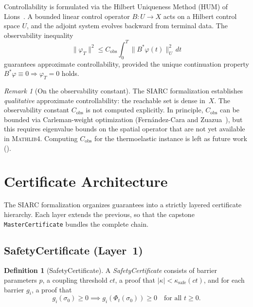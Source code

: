 \documentclass[11pt,a4paper]{article}
\theoremstyle{plain}
\theoremstyle{definition}
\newtheorem{definition}[theorem]{Definition}
\theoremstyle{remark}
\newtheorem{remark}[theorem]{Remark}
\newcommand{\norm}[1]{\lVert #1 \rVert}
\newcommand{\abs}[1]{\lvert #1 \rvert}
\newcommand{\kk}{\kappa}
\newcommand{\Mathlib}{\textsc{Mathlib4}}
\newcommand{\leaninline}[1]{\texttt{#1}}
\begin{document}
Controllability is formulated via the Hilbert Uniqueness Method (HUM) of
Lions~\cite{Lions1988}.  A bounded linear control operator
$B : U \to X$ acts on a Hilbert control space $U$, and the adjoint
system evolves backward from terminal data.  The observability inequality
\begin{equation}\label{eq:obs-ineq}
  \norm{\varphi_T}^2 \le C_{\mathrm{obs}} \int_0^T \norm{B^* \varphi(t)}_U^2 \, dt
\end{equation}
guarantees approximate controllability, provided the unique continuation
property $B^* \varphi \equiv 0 \Rightarrow \varphi_T = 0$ holds.

\begin{remark}[On the observability constant]\label{rem:cobs}
The SIARC formalization establishes \emph{qualitative} approximate
controllability: the reachable set is dense in~$X$.  The observability
constant $C_{\mathrm{obs}}$ is not computed explicitly.  In principle,
$C_{\mathrm{obs}}$ can be bounded via Carleman-weight optimization
(Fern\'{a}ndez-Cara and Zuazua~\cite{FernandezCara2000}), but this
requires eigenvalue bounds on the spatial operator that are not yet
available in \Mathlib{}.  Computing $C_{\mathrm{obs}}$ for the
thermoelastic instance is left as future work ().
\end{remark}


\section{Certificate Architecture}\label{sec:cert}

The SIARC formalization organizes guarantees into a strictly layered
certificate hierarchy.  Each layer extends the previous, so that the
capstone \leaninline{MasterCertificate} bundles the complete chain.

\subsection{SafetyCertificate (Layer~1)}

\begin{definition}[SafetyCertificate]\label{def:safety-cert}
A \emph{SafetyCertificate} consists of barrier parameters $p$, a
coupling threshold $ct$, a proof that $\abs{\kk} < \kk_{\mathrm{safe}}(ct)$,
and for each barrier $g_i$, a proof that
\[
  g_i(\sigma_0) \ge 0 \implies g_i(\Phi_t(\sigma_0)) \ge 0
  \quad \text{for all } t \ge 0.
\]
\end{definition}
\end{document}
